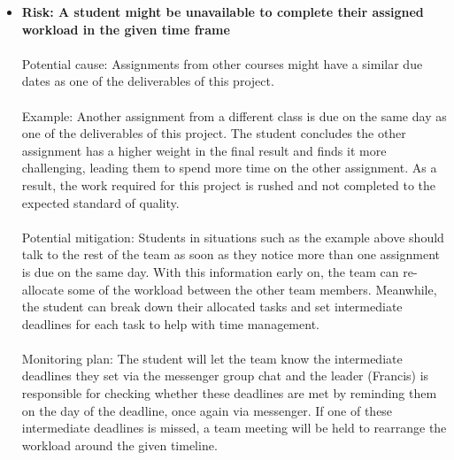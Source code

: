
\begin{itemize}

\item\textbf{Risk: A student might be unavailable to complete their assigned workload in the given time frame}
\\
\\ Potential cause: Assignments from other courses might have a similar due dates as one of the deliverables of this project.
\\
\\ Example: Another assignment from a different class is due on the same day as one of the deliverables of this project. The student concludes the other assignment has a higher weight in the final result and finds it more challenging, leading them to spend more time on the other assignment. As a result, the work required for this project is rushed and not completed to the expected standard of quality.
\\
\\ Potential mitigation: Students in situations such as the example above should talk to the rest of the team as soon as they notice more than one assignment is due on the same day. With this information early on, the team can re-allocate some of the workload between the other team members. Meanwhile, the student can break down their allocated tasks and set intermediate deadlines for each task to help with time management.
\\
\\ Monitoring plan: The student will let the team know the intermediate deadlines they set via the messenger group chat and the leader (Francis) is responsible for checking whether these deadlines are met by reminding them on the day of the deadline, once again via messenger. If one of these intermediate deadlines is missed, a team meeting will be held to rearrange the workload around the given timeline.
\\
\\


\end{itemize}
